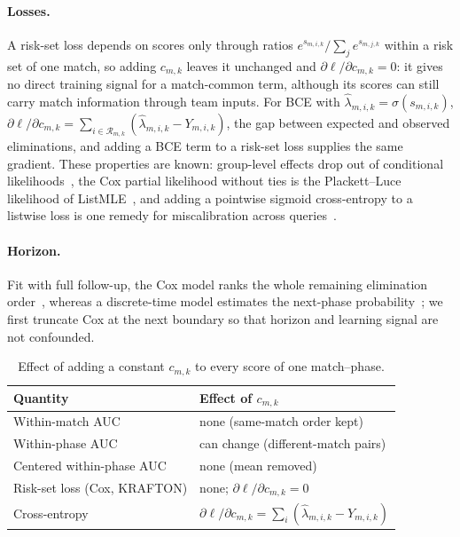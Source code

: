 \documentclass[sigconf,anonymous]{acmart}
\begin{document}
\paragraph{Losses.}
A risk-set loss depends on scores only through ratios $e^{s_{m,i,k}}/\sum_{j}e^{s_{m,j,k}}$ within a risk set of one match, so adding $c_{m,k}$ leaves it unchanged and $\partial\ell/\partial c_{m,k}=0$: it gives no direct training signal for a match-common term, although its scores can still carry match information through team inputs. For BCE with $\hat\lambda_{m,i,k}=\sigma(s_{m,i,k})$, $\partial\ell/\partial c_{m,k}=\sum_{i\in\mathcal{R}_{m,k}}(\hat\lambda_{m,i,k}-Y_{m,i,k})$, the gap between expected and observed eliminations, and adding a BCE term to a risk-set loss supplies the same gradient. These properties are known: group-level effects drop out of conditional likelihoods~\cite{Chamberlain80}, the Cox partial likelihood without ties is the Plackett--Luce likelihood of ListMLE~\cite{Xia08}, and adding a pointwise sigmoid cross-entropy to a listwise loss is one remedy for miscalibration across queries~\cite{Bai23}.

\paragraph{Horizon.}
Fit with full follow-up, the Cox model ranks the whole remaining elimination order~\cite{Cox72}, whereas a discrete-time model estimates the next-phase probability~\cite{SingerWillett93,Gensheimer19}; we first truncate Cox at the next boundary so that horizon and learning signal are not confounded.

\begin{table}[t]
\centering\footnotesize
\caption{Effect of adding a constant $c_{m,k}$ to every score of one match--phase.}
\label{tab:account}
\setlength{\tabcolsep}{3pt}
\begin{tabular}{ll}
\toprule
Quantity & Effect of $c_{m,k}$ \\
\midrule
Within-match AUC & none (same-match order kept) \\
Within-phase AUC & can change (different-match pairs) \\
Centered within-phase AUC & none (mean removed) \\
Risk-set loss (Cox, KRAFTON) & none; $\partial\ell/\partial c_{m,k}=0$ \\
Cross-entropy & $\partial\ell/\partial c_{m,k}=\sum_{i}(\hat\lambda_{m,i,k}-Y_{m,i,k})$ \\
\bottomrule
\end{tabular}
\end{table}
\end{document}
